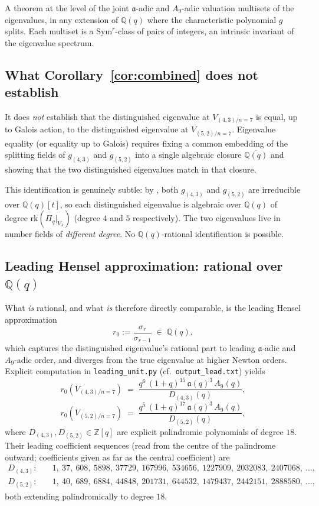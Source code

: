 \documentclass[11pt]{article}
\theoremstyle{plain}
\theoremstyle{definition}
\theoremstyle{remark}
\newcommand{\Z}{\mathbb{Z}}
\newcommand{\Q}{\mathbb{Q}}
\newcommand{\Pibs}{\Pi_q}
\newcommand{\Vlam}{V_\lambda}
\newcommand{\rk}{\mathrm{rk}}
\newcommand{\atom}{\mathfrak{a}}
\begin{document}
A theorem at the level of the joint $\atom$-adic and $A_9$-adic valuation
multisets of the eigenvalues, in any extension of $\Q(q)$ where the
characteristic polynomial $g$ splits.  Each multiset is a $\mathrm{Sym}^r$-class
of pairs of integers, an intrinsic invariant of the eigenvalue spectrum.

\subsection{What Corollary~\ref{cor:combined} does not establish}

It does \emph{not} establish that the distinguished eigenvalue at $V_{(4,3)/n=7}$
is equal, up to Galois action, to the distinguished eigenvalue at
$V_{(5,2)/n=7}$.  Eigenvalue equality (or equality up to Galois) requires fixing
a common embedding of the splitting fields of $g_{(4,3)}$ and $g_{(5,2)}$ into a
single algebraic closure $\overline{\Q(q)}$ and showing that the two
distinguished eigenvalues match in that closure.

This identification is genuinely subtle: by \cite[Discussion \S 5.2 item 3]{Newton28},
both $g_{(4,3)}$ and $g_{(5,2)}$ are irreducible over $\Q(q)[t]$, so each
distinguished eigenvalue is algebraic over $\Q(q)$ of degree $\rk(\Pibs|_{\Vlam})$
(degree $4$ and $5$ respectively).  The two eigenvalues live in number fields of
\emph{different degree}.  No $\Q(q)$-rational identification is possible.

\subsection{Leading Hensel approximation: rational over $\Q(q)$}

What \emph{is} rational, and what \emph{is} therefore directly comparable, is
the leading Hensel approximation
\[ r_0 := \frac{\sigma_r}{\sigma_{r-1}} \;\in\; \Q(q), \]
which captures the distinguished eigenvalue's rational part to leading
$\atom$-adic and $A_9$-adic order, and diverges from the true eigenvalue at
higher Newton orders.  Explicit computation in \texttt{leading\_unit.py} (cf.\
\texttt{output\_lead.txt}) yields
\[ r_0\!\left(V_{(4,3)/n=7}\right)
   \;=\; \frac{q^6 \, (1+q)^{15} \, \atom(q)^3 \, A_9(q)}{D_{(4,3)}(q)}, \]
\[ r_0\!\left(V_{(5,2)/n=7}\right)
   \;=\; \frac{q^5 \, (1+q)^{17} \, \atom(q)^3 \, A_9(q)}{D_{(5,2)}(q)}, \]
where $D_{(4,3)}, D_{(5,2)} \in \Z[q]$ are explicit palindromic polynomials of
degree $18$.  Their leading coefficient sequences (read from the centre of the
palindrome outward; coefficients given as far as the central coefficient) are
\begin{align*}
D_{(4,3)}: &\quad 1,\ 37,\ 608,\ 5898,\ 37729,\ 167996,\ 534656,\ 1227909,\ 2032083,\ 2407068,\ \ldots, \\
D_{(5,2)}: &\quad 1,\ 40,\ 689,\ 6884,\ 44848,\ 201731,\ 644532,\ 1479437,\ 2442151,\ 2888580,\ \ldots,
\end{align*}
both extending palindromically to degree $18$.
\end{document}
